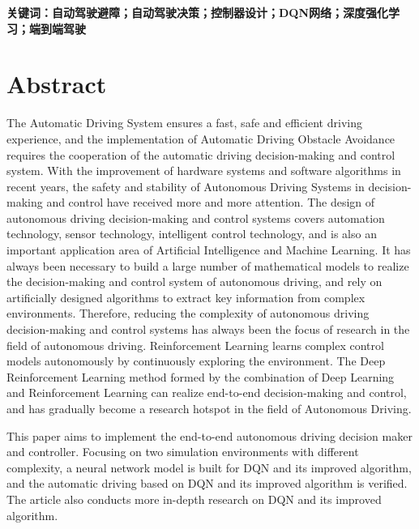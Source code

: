 \vspace{4ex}\noindent\textbf{\heiti 关键词：自动驾驶避障；自动驾驶决策；控制器设计；DQN网络；深度强化学习；端到端驾驶}
\newpage

\vspace*{-2mm}

\begin{spacing}{0.95}
  \centering
  \heiti{}\textbf{\thesisTitleEN}
\end{spacing}

\vspace*{17mm}

{\let\clearpage\relax \chapter*{
  \textmd{Abstract}\vskip -3bp}}
\setcounter{page}{2}

\setlength{\parskip}{0em}

The Automatic Driving System ensures a fast, safe and efficient driving experience, and the implementation of Automatic Driving Obstacle Avoidance requires the cooperation of the automatic driving decision-making and control system. With the improvement of hardware systems and software algorithms in recent years, the safety and stability of Autonomous Driving Systems in decision-making and control have received more and more attention. The design of autonomous driving decision-making and control systems covers automation technology, sensor technology, intelligent control technology, and is also an important application area of ​​Artificial Intelligence and Machine Learning. It has always been necessary to build a large number of mathematical models to realize the decision-making and control system of autonomous driving, and rely on artificially designed algorithms to extract key information from complex environments. Therefore, reducing the complexity of autonomous driving decision-making and control systems has always been the focus of research in the field of autonomous driving. Reinforcement Learning learns complex control models autonomously by continuously exploring the environment. The Deep Reinforcement Learning method formed by the combination of Deep Learning and Reinforcement Learning can realize end-to-end decision-making and control, and has gradually become a research hotspot in the field of Autonomous Driving.

This paper aims to implement the end-to-end autonomous driving decision maker and controller. Focusing on two simulation environments with different complexity, a neural network model is built for DQN and its improved algorithm, and the automatic driving based on DQN and its improved algorithm is verified. The article also conducts more in-depth research on DQN and its improved algorithm. 


